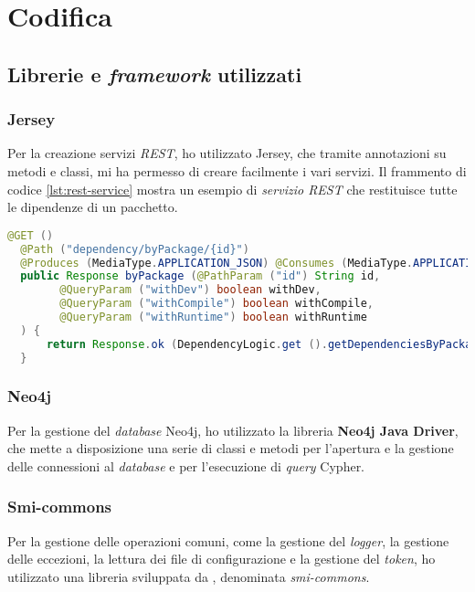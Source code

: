 
\section*{Codifica}
\subsection*{Librerie e \textit{framework} utilizzati}
\subsubsection*{Jersey}
Per la creazione servizi \textit{REST}, ho utilizzato Jersey, che tramite annotazioni su metodi e classi, 
mi ha permesso di creare facilmente i vari servizi.
Il frammento di codice \ref*{lst:rest-service} mostra un esempio di \textit{servizio REST} che restituisce tutte le dipendenze di un pacchetto.\\
\begin{lstlisting}[language=Java, caption={Esempio di \textit{servizio REST} utilizzando Jersey.},captionpos=b, label={lst:rest-service}]
  @GET ()
  @Path ("dependency/byPackage/{id}")
  @Produces (MediaType.APPLICATION_JSON) @Consumes (MediaType.APPLICATION_JSON)
  public Response byPackage (@PathParam ("id") String id, 
        @QueryParam ("withDev") boolean withDev, 
        @QueryParam ("withCompile") boolean withCompile, 
        @QueryParam ("withRuntime") boolean withRuntime
  ) {
      return Response.ok (DependencyLogic.get ().getDependenciesByPackage (id, withDev, withCompile, withRuntime)).build ();
  }
\end{lstlisting}

\subsubsection*{Neo4j}
Per la gestione del \textit{database} Neo4j, ho utilizzato la libreria \textbf{Neo4j Java Driver}, 
che mette a disposizione una serie di classi e metodi per l'apertura e la gestione delle connessioni al \textit{database} e 
per l'esecuzione di \textit{query} Cypher.\\

\subsubsection*{Smi-commons}
Per la gestione delle operazioni comuni, come la gestione del \textit{logger}, la gestione delle eccezioni, la lettura dei 
file di configurazione e la gestione del \textit{token}, ho utilizzato una libreria sviluppata da \azienda{}, denominata \textit{smi-commons}.\\

